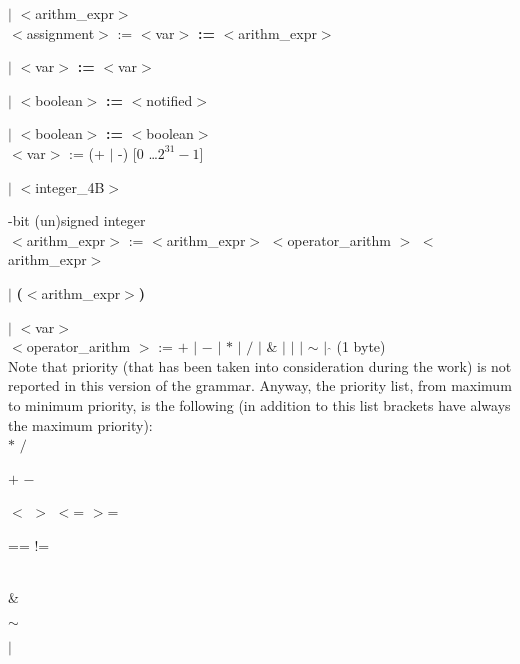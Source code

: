 \documentclass[12pt]{article}
\begin{document}
\begin{onecolumn}
\indent \indent \indent \indent \indent \indent \indent \indent \indent $|$ $<$arithm\_expr$>$\\

\indent \indent \indent $<$assignment$>$ := $<$var$>$ \textbf{:=} $<$arithm\_expr$>$

\indent \indent \indent \indent \indent \indent \indent \indent $|$ $<$var$>$ \textbf{:=} $<$var$>$ 

\indent \indent \indent \indent \indent \indent \indent \indent $|$ $<$boolean$>$ \textbf{:=} $<$notified$>$ 

\indent \indent \indent \indent \indent \indent \indent \indent $|$ $<$boolean$>$ \textbf{:=} $<$boolean$>$ \\

\indent \indent \indent \indent $<$var$>$ := (+ $|$ -) [0 \ldots $2^{31}-1$] 

\indent \indent \indent \indent \indent \indent \indent $|$ $<$integer\_4B$>$ 

\indent \indent \indent \indent \indent \indent {}-bit (un)signed integer\\ 

\indent \indent \indent $<$arithm\_expr$>$ := $<$arithm\_expr$>$ $<$operator\_arithm $>$ $<$arithm\_expr$>$

\indent \indent \indent \indent \indent \indent \indent \indent $|$ \textbf{(}$<$arithm\_expr$>$\textbf{)}

\indent \indent \indent \indent \indent \indent \indent \indent $|$ $<$var$>$ \\

\indent \indent \indent \indent $<$operator\_arithm $>$ := $+$ $|$ $-$ $|$ $*$ $|$ $/$ $|$ \& $|$ $|$ $|$ $\sim$ $|$ $\hat{}$ (1 byte)\\

\noindent Note that priority (that has been taken into consideration during the work) is not reported in this version of the grammar. Anyway, the priority list, from maximum to minimum priority, is the following (in addition to this list brackets have always the maximum priority):\\

$*$ $/$

$+$ $-$

$<$ $>$ $<$= $>$=

==  !=

$\hat{}$

\&

$\sim$

$|$ \\
 

\end{onecolumn}
\end{document}
